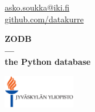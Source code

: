 \documentclass[aspectratio=169]{beamer}
\begin{document}
{\begin{frame}[plain,t]
\begin{columns}[onlytextwidth]
\begin{column}{0.45\textwidth}
      \href{mailto:asko.soukka@iki.fi}{asko.soukka@iki.fi}\\
      \href{https://github.com/datakure/}{github.com/datakurre}
      \vspace{0.5cm}
      \par
      \Huge
      \bfseries
      ZODB\\
      ---\\
      the Python database
      \par
      \large
      \mdseries
      \vspace{0.6cm}\par
      \href{https://www.jyu.fi/}{\includegraphics[width=3.1cm]{images/logo.eps}}
    \end{column}
  \end{columns}
\end{frame}
}

\end{document}
